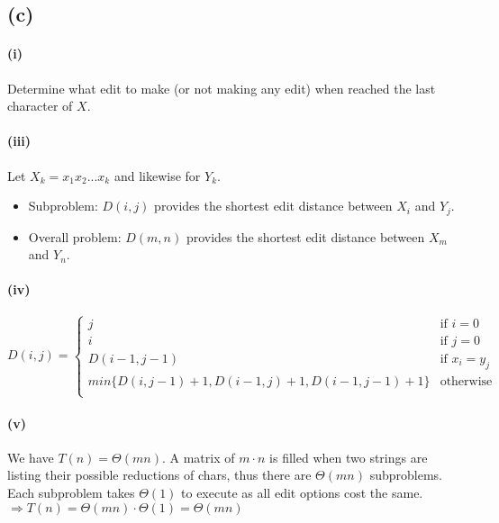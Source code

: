 \documentclass[11pt]{article}
\begin{document}
\subsection{(c)}

\paragraph{(i)} Determine what edit to make (or not making any edit) when reached the last character of $X$.

\paragraph{(iii)}
Let $X_k = x_1x_2...x_k$ and likewise for $Y_k$.

\begin{itemize}
    \item Subproblem: $D(i, j)$ provides the shortest edit distance between $X_i$ and $Y_j$.
    \item Overall problem: $D(m, n)$ provides the shortest edit distance between $X_m$ and $Y_n$.
\end{itemize}

\paragraph{(iv)}

\begin{equation}
    D(i, j) =
    \begin{cases}
        j & \text{if \ } i = 0 \\
        i & \text{if \ } j = 0 \\
        D(i-1, j-1) & \text{if \ } x_i = y_j \\
        min\{D(i, j-1) + 1, D(i-1, j) + 1, D(i-1, j-1) + 1  \} & \text{otherwise}\\
    \end{cases}\nonumber
\end{equation}

\paragraph{(v)}
We have $T(n) = \Theta(mn)$. A matrix of $m \cdot n$ is filled when two strings are listing their possible reductions of chars, thus there are $\Theta(mn)$ subproblems. Each subproblem takes $\Theta(1)$ to execute as all edit options cost the same.\\
$\Longrightarrow T(n) =  \Theta(mn) \cdot \Theta(1) =  \Theta(mn)$
\end{document}
